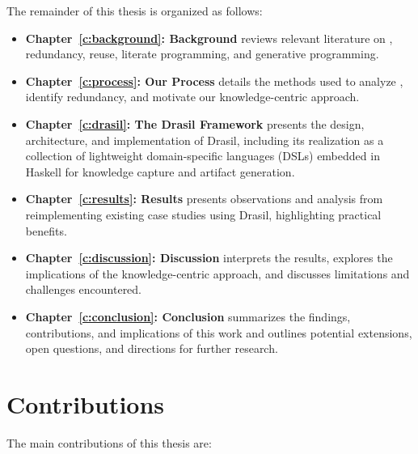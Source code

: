 The remainder of this thesis is organized as follows:
\begin{itemize}
    \item \textbf{Chapter~\ref{c:background}: Background} reviews relevant 
	literature on \sfs{}, redundancy, reuse, literate programming, 
    and generative programming.
    \item \textbf{Chapter~\ref{c:process}: Our Process} details the methods 
    used to analyze \sfs{}, identify redundancy, and motivate our 
    knowledge-centric approach.
    \item \textbf{Chapter~\ref{c:drasil}: The Drasil Framework} presents the 
    design, architecture, and implementation of Drasil, including its 
    realization as a collection of lightweight domain-specific languages
    (DSLs) embedded in Haskell for knowledge capture and artifact generation.
    \item \textbf{Chapter~\ref{c:results}: Results} presents observations
    and analysis from reimplementing existing case studies using Drasil,
    highlighting practical benefits.
    \item \textbf{Chapter~\ref{c:discussion}: Discussion} interprets the 
    results, explores the implications of the knowledge-centric approach, and
    discusses limitations and challenges encountered.
    \item \textbf{Chapter~\ref{c:conclusion}: Conclusion} summarizes the 
    findings, contributions, and implications of this work and outlines 
    potential extensions, open questions, and directions for further research.
\end{itemize}

\section{Contributions}

The main contributions of this thesis are:

